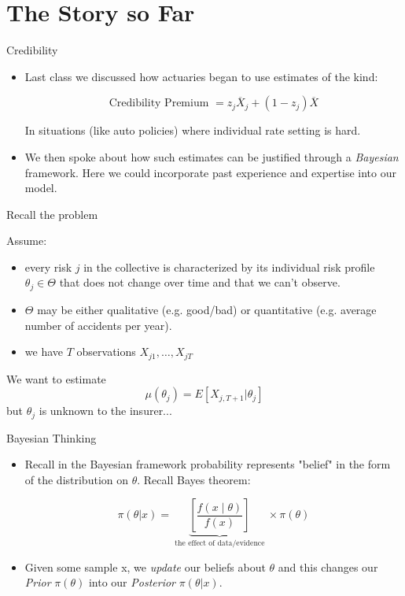 \documentclass[11pt]{beamer}
\begin{document}
\section{The Story so Far}
\begin{frame}{Credibility}

\begin{itemize}

\item Last class we discussed how actuaries began to use estimates of the kind:

$$\text{Credibility Premium }=z_{j}\overline{X}_{j}+\left(1-z_{j}\right) \overline{X}$$

In situations (like auto policies) where individual rate setting is hard. 

\vfill

\item We then spoke about how such estimates can be justified through a \emph{Bayesian} framework. Here we could incorporate past experience and expertise into our model. 

\end{itemize}

\end{frame}
\begin{frame}{Recall the problem}

Assume:
\begin{itemize}
\item every risk $j$ in the collective is characterized by its individual risk profile \alert{$\theta_j \in \Theta$} that does not change over time and that we can't observe.
\item $\Theta$ may be either qualitative (e.g. good/bad) or quantitative (e.g. average number of accidents per year).
\item we have $T$ observations $X_{j1},\ldots,X_{jT}$
\end{itemize}
We want to estimate
$$\mu(\theta_j)=E\left[X_{j,T+1}|\theta_j\right]$$
but $\theta_j$ is unknown to the insurer...

\end{frame}
\begin{frame}{Bayesian Thinking}


\begin{itemize}

\item Recall in the Bayesian framework probability represents "belief" in the form of the distribution on $\theta$. Recall Bayes theorem:

$$\pi(\theta | x)= \underbrace{\left[ \frac {f(x\mid \theta )}{f(x)} \right]}_{\text{ the effect of data/evidence }} \times \pi(\theta )$$

\vfill

\item Given some sample x, we \emph{update} our beliefs about $\theta$ and this changes our \emph{Prior} $\pi(\theta)$ into our \emph{Posterior} $\pi(\theta|x)$.


\end{itemize}

\end{frame}
\end{document}

